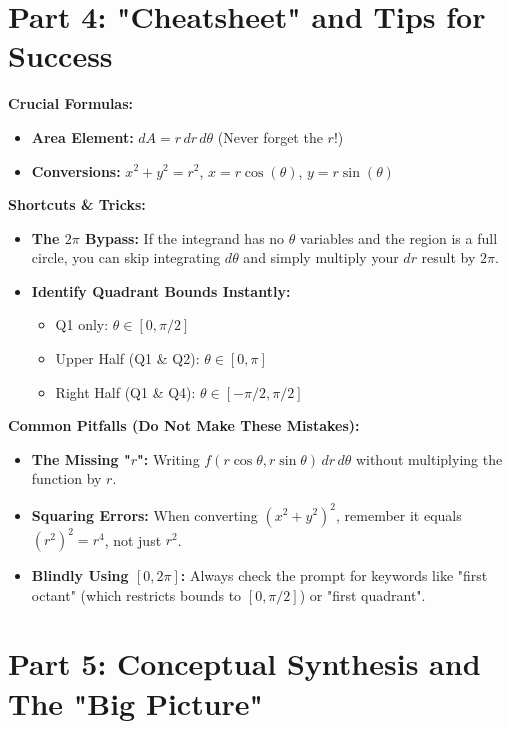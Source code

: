 \documentclass[12pt]{article}
\begin{document}
\newpage
\section{Part 4: "Cheatsheet" and Tips for Success}

\begin{tcolorbox}[title=The Polar Coordinates Cheatsheet]
\textbf{Crucial Formulas:}
\begin{itemize}
    \item \textbf{Area Element:} $dA = r \, dr \, d\theta$ (Never forget the $r$!)
    \item \textbf{Conversions:} $x^2 + y^2 = r^2$, \quad $x = r\cos(\theta)$, \quad $y = r\sin(\theta)$
\end{itemize}

\textbf{Shortcuts \& Tricks:}
\begin{itemize}
    \item \textbf{The $2\pi$ Bypass:} If the integrand has no $\theta$ variables and the region is a full circle, you can skip integrating $d\theta$ and simply multiply your $dr$ result by $2\pi$.
    \item \textbf{Identify Quadrant Bounds Instantly:}
        \begin{itemize}
            \item Q1 only: $\theta \in [0, \pi/2]$
            \item Upper Half (Q1 \& Q2): $\theta \in [0, \pi]$
            \item Right Half (Q1 \& Q4): $\theta \in [-\pi/2, \pi/2]$
        \end{itemize}
\end{itemize}

\textbf{Common Pitfalls (Do Not Make These Mistakes):}
\begin{itemize}
    \item \textbf{The Missing "$r$":} Writing $f(r\cos\theta, r\sin\theta) \, dr \, d\theta$ without multiplying the function by $r$.
    \item \textbf{Squaring Errors:} When converting $(x^2+y^2)^2$, remember it equals $(r^2)^2 = r^4$, not just $r^2$.
    \item \textbf{Blindly Using $[0, 2\pi]$:} Always check the prompt for keywords like "first octant" (which restricts bounds to $[0, \pi/2]$) or "first quadrant".
\end{itemize}
\end{tcolorbox}

\newpage
\section{Part 5: Conceptual Synthesis and The "Big Picture"}
\end{document}
